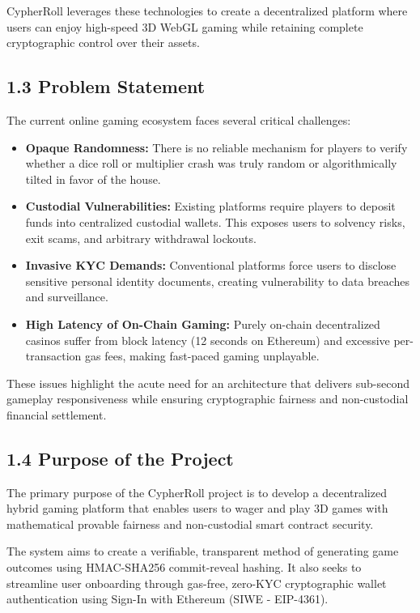 CypherRoll leverages these technologies to create a decentralized platform where users can enjoy high-speed 3D WebGL gaming while retaining complete cryptographic control over their assets.

\subsection*{1.3 Problem Statement}
The current online gaming ecosystem faces several critical challenges:
\begin{itemize}[leftmargin=1.5em]
    \item \textbf{Opaque Randomness:} There is no reliable mechanism for players to verify whether a dice roll or multiplier crash was truly random or algorithmically tilted in favor of the house.
    \item \textbf{Custodial Vulnerabilities:} Existing platforms require players to deposit funds into centralized custodial wallets. This exposes users to solvency risks, exit scams, and arbitrary withdrawal lockouts.
    \item \textbf{Invasive KYC Demands:} Conventional platforms force users to disclose sensitive personal identity documents, creating vulnerability to data breaches and surveillance.
    \item \textbf{High Latency of On-Chain Gaming:} Purely on-chain decentralized casinos suffer from block latency (12 seconds on Ethereum) and excessive per-transaction gas fees, making fast-paced gaming unplayable.
\end{itemize}

These issues highlight the acute need for an architecture that delivers sub-second gameplay responsiveness while ensuring cryptographic fairness and non-custodial financial settlement.

\subsection*{1.4 Purpose of the Project}
The primary purpose of the CypherRoll project is to develop a decentralized hybrid gaming platform that enables users to wager and play 3D games with mathematical provable fairness and non-custodial smart contract security.

The system aims to create a verifiable, transparent method of generating game outcomes using HMAC-SHA256 commit-reveal hashing. It also seeks to streamline user onboarding through gas-free, zero-KYC cryptographic wallet authentication using Sign-In with Ethereum (SIWE - EIP-4361).

